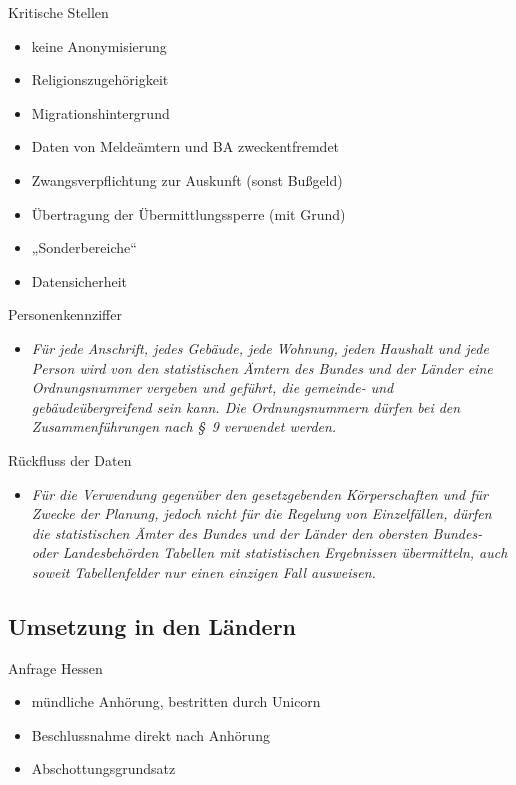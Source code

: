 \documentclass[ignorenonframetext,ucs]{beamer}
\begin{document}
\begin{frame}{Kritische Stellen}\begin{itemize}
\item keine Anonymisierung
\item Religionszugehörigkeit
\item Migrationshintergrund
\item Daten von Meldeämtern und BA zweckentfremdet
\item Zwangsverpflichtung zur Auskunft (sonst Bußgeld)
\item Übertragung der Übermittlungssperre (mit Grund)
\item „Sonderbereiche“
\item Datensicherheit
\end{itemize}\end{frame}

\begin{frame}{Personenkennziffer}\begin{itemize}
\item \emph{Für jede Anschrift, jedes Gebäude, jede Wohnung, jeden Haushalt und jede Person wird von den statistischen Ämtern des Bundes und der Länder eine Ordnungsnummer vergeben und geführt, die gemeinde- und gebäudeübergreifend sein kann. Die Ordnungsnummern dürfen bei den Zusammenführungen nach §~9 verwendet werden.}
\end{itemize}\end{frame}

\begin{frame}{Rückfluss der Daten}\begin{itemize}
\item \emph{Für die Verwendung gegenüber den gesetzgebenden Körperschaften und für Zwecke der Planung, jedoch nicht für die Regelung von Einzelfällen, dürfen die statistischen Ämter des Bundes und der Länder den obersten Bundes- oder Landesbehörden Tabellen mit statistischen Ergebnissen übermitteln, auch soweit Tabellenfelder nur einen einzigen Fall ausweisen.}
\end{itemize}\end{frame}

\subsection{Umsetzung in den Ländern}

\begin{frame}{Anfrage Hessen}\begin{itemize}
\item mündliche Anhörung, bestritten durch Unicorn
\item Beschlussnahme direkt nach Anhörung
\item Abschottungsgrundsatz
\end{itemize}\end{frame}
\end{document}
